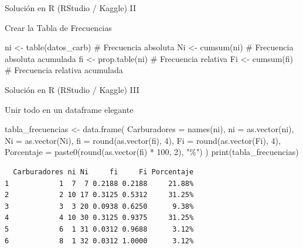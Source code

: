 \documentclass[
  ignorenonframetext,
  aspectratio=169,
  spanish,
]{beamer}
\newenvironment{Shaded}{\begin{snugshade}}{\end{snugshade}}
\newcommand{\AttributeTok}[1]{\textcolor[rgb]{0.40,0.45,0.13}{#1}}
\newcommand{\CommentTok}[1]{\textcolor[rgb]{0.37,0.37,0.37}{#1}}
\newcommand{\DecValTok}[1]{\textcolor[rgb]{0.68,0.00,0.00}{#1}}
\newcommand{\FunctionTok}[1]{\textcolor[rgb]{0.28,0.35,0.67}{#1}}
\newcommand{\NormalTok}[1]{\textcolor[rgb]{0.00,0.23,0.31}{#1}}
\newcommand{\OtherTok}[1]{\textcolor[rgb]{0.00,0.23,0.31}{#1}}
\newcommand{\SpecialCharTok}[1]{\textcolor[rgb]{0.37,0.37,0.37}{#1}}
\newcommand{\StringTok}[1]{\textcolor[rgb]{0.13,0.47,0.30}{#1}}
\begin{document}
\begin{frame}[fragile]{Solución en R (RStudio / Kaggle) II}
\label{soluciuxf3n-en-r-rstudio-kaggle-ii}
\begin{block}{Crear la Tabla de Frecuencias}
\label{crear-la-tabla-de-frecuencias}
\begin{Shaded}
\begin{Highlighting}[]
\NormalTok{ni }\OtherTok{\textless{}{-}} \FunctionTok{table}\NormalTok{(datos\_carb) }\CommentTok{\# Frecuencia absoluta}
\NormalTok{Ni }\OtherTok{\textless{}{-}} \FunctionTok{cumsum}\NormalTok{(ni)    }\CommentTok{\# Frecuencia absoluta acumulada}
\NormalTok{fi }\OtherTok{\textless{}{-}} \FunctionTok{prop.table}\NormalTok{(ni) }\CommentTok{\# Frecuencia relativa}
\NormalTok{Fi }\OtherTok{\textless{}{-}} \FunctionTok{cumsum}\NormalTok{(fi) }\CommentTok{\# Frecuencia relativa acumulada}
\end{Highlighting}
\end{Shaded}
\end{block}
\end{frame}

\begin{frame}[fragile]{Solución en R (RStudio / Kaggle) III}
\label{soluciuxf3n-en-r-rstudio-kaggle-iii}
\begin{block}{Unir todo en un dataframe elegante}
\label{unir-todo-en-un-dataframe-elegante}
\begin{Shaded}
\begin{Highlighting}[]
\NormalTok{tabla\_frecuencias }\OtherTok{\textless{}{-}} \FunctionTok{data.frame}\NormalTok{(}
  \AttributeTok{Carburadores =} \FunctionTok{names}\NormalTok{(ni),}
  \AttributeTok{ni =} \FunctionTok{as.vector}\NormalTok{(ni),}
  \AttributeTok{Ni =} \FunctionTok{as.vector}\NormalTok{(Ni),}
  \AttributeTok{fi =} \FunctionTok{round}\NormalTok{(}\FunctionTok{as.vector}\NormalTok{(fi), }\DecValTok{4}\NormalTok{),}
  \AttributeTok{Fi =} \FunctionTok{round}\NormalTok{(}\FunctionTok{as.vector}\NormalTok{(Fi), }\DecValTok{4}\NormalTok{),}
  \AttributeTok{Porcentaje =} \FunctionTok{paste0}\NormalTok{(}\FunctionTok{round}\NormalTok{(}\FunctionTok{as.vector}\NormalTok{(fi) }\SpecialCharTok{*} \DecValTok{100}\NormalTok{, }\DecValTok{2}\NormalTok{), }\StringTok{"\%"}\NormalTok{) )}
\FunctionTok{print}\NormalTok{(tabla\_frecuencias)}
\end{Highlighting}
\end{Shaded}

\begin{verbatim}
  Carburadores ni Ni     fi     Fi Porcentaje
1            1  7  7 0.2188 0.2188     21.88%
2            2 10 17 0.3125 0.5312     31.25%
3            3  3 20 0.0938 0.6250      9.38%
4            4 10 30 0.3125 0.9375     31.25%
5            6  1 31 0.0312 0.9688      3.12%
6            8  1 32 0.0312 1.0000      3.12%
\end{verbatim}
\end{block}
\end{frame}
\end{document}
